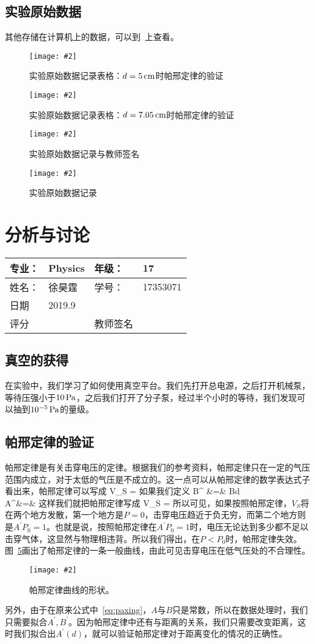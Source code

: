 \documentclass{ctexart}
\newcommand{\cpic}[2]{
\begin{center}
\texttt{[image: \#2]}
\end{center}
}
\newcommand{\cpicn}[3]
{
\begin{figure}[H]
\cpic{#1}{#2}
\caption{#3\label{#2}}
\end{figure}
}
\begin{document}
\subsection{实验原始数据}
其他存储在计算机上的数据，可以到~\cite{git}上查看。
\cpicn{0.25}{original_1.jpg}{实验原始数据记录表格：$d = 5\,\mathrm{cm}$时帕邢定律的验证}
\cpicn{0.25}{original_2.jpg}{实验原始数据记录表格：$d = 7.05\,\mathrm{cm}$时帕邢定律的验证}
\cpicn{0.25}{original_3}{实验原始数据记录与教师签名}
\cpicn{0.25}{original_4}{实验原始数据记录}

\newpage
\section{分析与讨论}
\begin{tabular}{|p{8em}|p{8em}|p{8em}|p{8em}|}
	\hline 
	专业：     &Physics       &年级：      & 17     \\
	\hline
	姓名：& 徐昊霆 &学号：&17353071  \\
	\hline
	日期&     2019.9               & &  \\
	\hline	
	评分 & & 教师签名 & \\
	\hline
\end{tabular}
\subsection{真空的获得}
在实验中，我们学习了如何使用真空平台。我们先打开总电源，之后打开机械泵，等待压强小于$10\,\mathrm{Pa}$，之后我们打开了分子泵，经过半个小时的等待，我们发现可以抽到$10^{-5}\,\mathrm{Pa}$的量级。
\subsection{帕邢定律的验证}
帕邢定律是有关击穿电压的定律。根据我们的参考资料，帕邢定律只在一定的气压范围内成立，对于太低的气压是不成立的。这一点可以从帕邢定律的数学表达式子看出来，帕邢定律可以写成
\beq\label{eq:paxing}
V_S = 
\eeq
如果我们定义
\bea
B^{\prime} &=& Bd  \label{eq:A} \\
A^{\prime}&=&  \label{eq:B}
\eea
这样我们就把帕邢定律写成
\beq
V_S = 
\eeq
所以可见，如果按照帕邢定律，$V_S$将在两个地方发散，第一个地方是$P = 0$，击穿电压趋近于负无穷，而第二个地方则是$A^{\prime}P_0 = 1$。也就是说，按照帕邢定律在$A^{\prime}P_0 = 1$时，电压无论达到多少都不足以击穿气体，这显然与物理相违背。所以我们得出，在$P<P_0$时，帕邢定律失效。图~\ref{general.jpeg}画出了帕邢定律的一条一般曲线，由此可见击穿电压在低气压处的不合理性。
\cpicn{0.5}{general.jpeg}{\color{red} 帕邢定律曲线的形状。}
\par  另外，由于在原来公式中~\ref{eq:paxing}，$A$与$B$只是常数，所以在数据处理时，我们只需要拟合$A^{\prime},B^{\prime}$。因为帕邢定律中还有与距离的关系，我们只需要改变距离，这时我们拟合出$A^{\prime}(d)$，就可以验证帕邢定律对于距离变化的情况的正确性。
\end{document}
